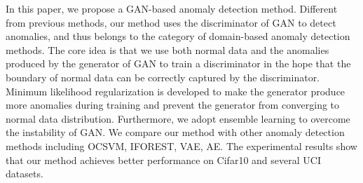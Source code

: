 \documentclass[a4paper,conference]{IEEEtran}
\begin{document}



In this paper, we propose a GAN-based anomaly detection method. Different from previous methods, our method uses the discriminator of GAN to detect anomalies, and thus belongs to the category of domain-based anomaly detection methods. The core idea is that we use both normal data and the anomalies produced by the generator of GAN to train a discriminator in the hope that the boundary of normal data can be correctly captured by the discriminator. Minimum likelihood regularization is developed to make the generator produce more anomalies during training and prevent the generator from converging to normal data distribution. Furthermore, we adopt ensemble learning to overcome the instability of GAN. We compare our method with other anomaly detection methods including OCSVM, IFOREST, VAE, AE. The experimental results show that our method achieves better performance on Cifar10 and several UCI datasets.
\end{document}
